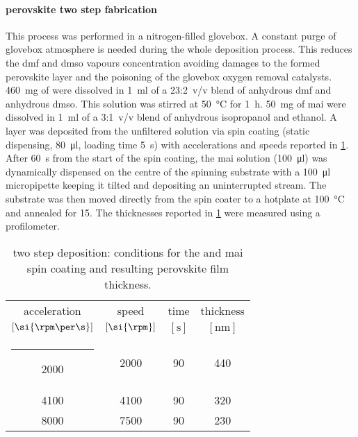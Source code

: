 		\FloatBarrier
		\paragraph{ perovskite two step fabrication}
		This process was performed in a nitrogen-filled glovebox.
		A constant purge of glovebox atmosphere is needed during the whole deposition process.
		This reduces the \gls{dmf} and \gls{dmso} vapours concentration avoiding damages to the formed perovskite layer and the poisoning of the glovebox oxygen removal catalysts.
		\SI{460}{\mg} of  were dissolved in \SI{1}{\ml} of a 23:2~v/v blend of anhydrous \gls{dmf} and anhydrous \gls{dmso}.
		This solution was stirred at \SI{50}{\celsius} for \SI{1}{\hour}.
		\SI{50}{\mg} of \gls{mai} were dissolved in \SI{1}{\ml} of a 3:1~v/v blend of anhydrous isopropanol and ethanol.
		A  layer was deposited from the unfiltered solution via spin coating (static dispensing, \SI{80}{\ul}, loading time \SI{5}{\s}) with accelerations and speeds reported in \cref{table:mapi_thickness}.
		After \SI{60}{\s} from the start of the spin coating, the \gls{mai} solution (\SI{100}{\ul}) was dynamically dispensed on the centre of the spinning substrate with a \SI{100}{\ul} micropipette keeping it tilted and depositing an uninterrupted stream.
		The substrate was then moved directly from the spin coater to a hotplate at \SI{100}{\celsius} and annealed for \SI{15}{\min}.
		The thicknesses reported in \cref{table:mapi_thickness} were measured using a profilometer.

		\begin{table}%
			\caption{ two step deposition: conditions for the  and \gls{mai} spin coating and resulting perovskite film thickness.}\label{table:mapi_thickness}
			\begin{center}
				\begin{tabular}{c c c | c}
					acceleration        & speed         & time        & thickness    \\
					$[\si{\rpm\per\s}]$ & $[\si{\rpm}]$ & $[\si{\s}]$ & $[\si{\nm}]$ \\[1mm]
					\hline
					\rule[0ex]{-4pt}{3ex}
					2000                & 2000          & 90          & 440          \\
					4100                & 4100          & 90          & 320          \\
					8000                & 7500          & 90          & 230          \\
				\end{tabular}
			\end{center}
		\end{table}


